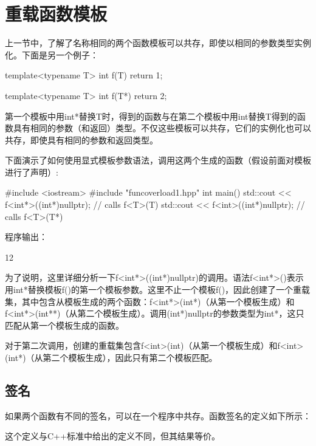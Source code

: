 \section{重载函数模板}


上一节中，了解了名称相同的两个函数模板可以共存，即使以相同的参数类型实例化。下面是另一个例子：

\begin{cpp}
template<typename T>
int f(T) {
	return 1;
}

template<typename T>
int f(T*) {
	return 2;
}
\end{cpp}

第一个模板中用int*替换T时，得到的函数与在第二个模板中用int替换T得到的函数具有相同的参数（和返回）类型。不仅这些模板可以共存，它们的实例化也可以共存，即使具有相同的参数和返回类型。

下面演示了如何使用显式模板参数语法，调用这两个生成的函数（假设前面对模板进行了声明）:

\begin{cpp}
#include <iostream>
#include "funcoverload1.hpp"
int main() {
	std::cout << f<int*>((int*)nullptr); // calls f<T>(T)
	std::cout << f<int>((int*)nullptr); // calls f<T>(T*)
}
\end{cpp}

程序输出：

\begin{shell}
12
\end{shell}

为了说明，这里详细分析一下f<int*>((int*)nullptr)的调用。语法f<int*>()表示用int*替换模板f()的第一个模板参数。这里不止一个模板f()，因此创建了一个重载集，其中包含从模板生成的两个函数：f<int*>(int*)（从第一个模板生成）和f<int*>(int**)（从第二个模板生成）。调用(int*)nullptr的参数类型为int*，这只匹配从第一个模板生成的函数。

对于第二次调用，创建的重载集包含f<int>(int)（从第一个模板生成）和f<int>(int*)（从第二个模板生成），因此只有第二个模板匹配。

\subsection{签名}

如果两个函数有不同的签名，可以在一个程序中共存。函数签名的定义如下所示：

\begin{notice}
这个定义与C++标准中给出的定义不同，但其结果等价。
\end{notice}

